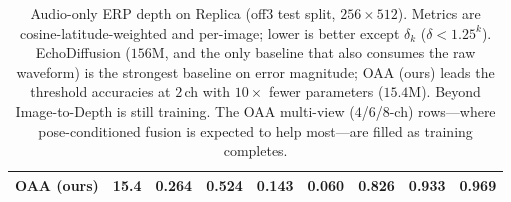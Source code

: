 \begin{table}[t]
\begin{tabular}{@{}lrccccccc@{}}
\textbf{OAA (ours)}         & \textbf{15.4} & 0.264 & 0.524 & \textbf{0.143} & \textbf{0.060} & \textbf{0.826} & \textbf{0.933} & \textbf{0.969} \\
\bottomrule
\end{tabular}
\caption{Audio-only ERP depth on Replica (off3 test split, $256\times512$). Metrics
are cosine-latitude-weighted and per-image; lower is better except $\delta_k$
($\delta{<}1.25^{k}$). EchoDiffusion ($156$M, and the only baseline that also consumes
the raw waveform) is the strongest baseline on error magnitude; OAA (ours) leads the
threshold accuracies at $2$\,ch with $10\times$ fewer parameters ($15.4$M). Beyond
Image-to-Depth is still training. The OAA multi-view ($4$/$6$/$8$-ch) rows---where
pose-conditioned fusion is expected to help most---are filled as training completes.}
\label{tab:main}
\end{table}

